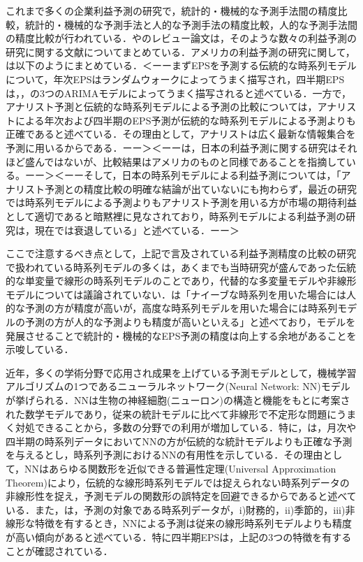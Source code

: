 \documentclass[a4paper，12pt]{jsarticle}
\begin{document}
これまで多くの企業利益予測の研究で，統計的・機械的な予測手法間の精度比較，統計的・機械的な予測手法と人的な予測手法の精度比較，人的な予測手法間の精度比較が行われている．\cite{sakurai1990}や\cite{ota2006}のレビュー論文は，そのような数々の利益予測の研究に関する文献についてまとめている．アメリカの利益予測の研究に関して，\cite{sakurai1990}は以下のようにまとめている．＜ーーまずEPSを予測する伝統的な時系列モデルについて，年次EPSはランダムウォークによってうまく描写され，四半期EPSは\cite*{brown1979univariate}，\cite{griffin1977time}，\cite{foster1977quarterly}の3つのARIMAモデルによってうまく描写されると述べている．一方で，アナリスト予測と伝統的な時系列モデルによる予測の比較については，アナリストによる年次および四半期のEPS予測が伝統的な時系列モデルによる予測よりも正確であると述べている．その理由として，アナリストは広く最新な情報集合を予測に用いるからである．ーー＞＜ーー\cite{ota2006}は，日本の利益予測に関する研究はそれほど盛んではないが、比較結果はアメリカのものと同様であることを指摘している。ーー＞＜ーーそして，日本の時系列モデルによる利益予測については，「アナリスト予測との精度比較の明確な結論が出ていないにも拘わらず，最近の研究では時系列モデルによる予測よりもアナリスト予測を用いる方が市場の期待利益として適切であると暗黙裡に見なされており，時系列モデルによる利益予測の研究は，現在では衰退している」と述べている．ーー＞

ここで注意するべき点として，上記で言及されている利益予測精度の比較の研究で扱われている時系列モデルの多くは，あくまでも当時研究が盛んであった伝統的な単変量で線形の時系列モデルのことであり，代替的な多変量モデルや非線形モデルについては議論されていない．\cite{ota2006}は「ナイーブな時系列を用いた場合には人的な予測の方が精度が高いが，高度な時系列モデルを用いた場合には時系列モデルの予測の方が人的な予測よりも精度が高いといえる」と述べており，モデルを発展させることで統計的・機械的なEPS予測の精度は向上する余地があることを示唆している．

近年，多くの学術分野で応用され成果を上げている予測モデルとして，機械学習アルゴリズムの1つであるニューラルネットワーク(Neural Network: NN)モデルが挙げられる．NNは生物の神経細胞(ニューロン)の構造と機能をもとに考案された数学モデルであり，従来の統計モデルに比べて非線形で不定形な問題にうまく対処できることから，多数の分野での利用が増加している\citep*{tkavc2016artificial}．特に，\cite{hill1996neural}は，月次や四半期の時系列データにおいてNNの方が伝統的な統計モデルよりも正確な予測を与えるとし，時系列予測におけるNNの有用性を示している．その理由として，NNはあらゆる関数形を近似できる普遍性定理(Universal Approximation Theorem)\citep{hornik1989multilayer}により，伝統的な線形時系列モデルでは捉えられない時系列データの非線形性を捉え，予測モデルの関数形の誤特定を回避できるからであると述べている．また，\cite{hill1994artificial}は，予測の対象である時系列データが，i)財務的，ii)季節的，iii)非線形な特徴を有するとき，NNによる予測は従来の線形時系列モデルよりも精度が高い傾向があると述べている．特に四半期EPSは，上記の3つの特徴を有することが確認されている\citep*{hopwood1986univariate}．
\end{document}
